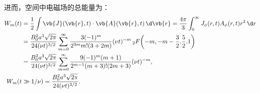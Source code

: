 \begin{example}
	进而，空间中电磁场的总能量为：
	\begin{align*}
		W_m(t) & = \frac12 \int \vb{J}(\vb{r},t) \cdot \vb{A}(\vb{r},t) \,\d \vb{r}
		= \frac{4\pi}{3} \int_0^\infty J_\phi(r,t) A_\phi(r,t) r^2 \,\d r                                                                                                            \\
		       & = \frac{B_0^2 a^3 \sqrt{2\pi}}{24 (\nu t)^{3/2}} \sum_{m=0}^\infty \frac{3(-1)^m}{2^{3m} m! (3+2m)} (\nu t)^{-m}\, _2F\!\left(-m, -m-\frac32. \frac52. 1\right) \\
		       & = \frac{B_0^2 a^3 \sqrt{2\pi}}{24 (\nu t)^{3/2}} \sum_{m=0}^\infty \frac{9(-1)^m (m+1)}{2^{m-1} (m+3)! (2m+3)} (\nu t)^{-m},                                    \\
		W_m(t  & \gg 1/\nu) = \frac{B_0^2 a^3 \sqrt{2\pi}}{24 (\nu t)^{3/2}}.
	\end{align*}
\end{example}

